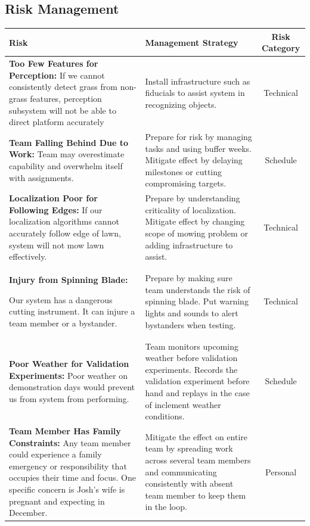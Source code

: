 \documentclass[12pt]{extarticle}
\begin{document}
\subsection{Risk Management}
\begin{table}[H]
\def\arraystretch{1.7}

\begin{tabular}{p{7cm}p{6cm}c}
 {Risk} &  {Management Strategy} &  {Risk Category}\\
\hline 
 \textbf{Too Few Features for Perception:} 
If we cannot consistently detect grass from non-grass features, perception subsystem will not be able to direct platform accurately
&
Install infrastructure such as fiducials to assist system in recognizing objects.
&
Technical\\

 \textbf{Team Falling Behind Due to Work:} 
Team may overestimate capability and overwhelm itself with assignments.
&
Prepare for risk by managing tasks and using buffer weeks. Mitigate effect by delaying milestones or cutting compromising targets.
&
Schedule\\
 \textbf{Localization Poor for Following Edges:} 
If our localization algorithms cannot accurately follow edge of lawn, system will not mow lawn effectively.
&
Prepare by understanding criticality of localization. Mitigate effect by changing scope of mowing problem or adding infrastructure to assist.
&
Technical\\
 \textbf{Injury from Spinning Blade:} 

Our system has a dangerous cutting instrument. It can injure a team member or a bystander.
&
Prepare by making sure team understands the risk of spinning blade. Put warning lights and sounds to alert bystanders when testing.
&
Technical\\

 \textbf{Poor Weather for Validation Experiments:} 
Poor weather on demonstration days would prevent us from system from performing.
&
Team monitors upcoming weather before validation experiments.  Records the validation experiment before hand and replays in the case of inclement weather conditions.
&
Schedule\\

 \textbf{Team Member Has Family Constraints:} 
Any team member could experience a family emergency or responsibility that occupies their time and focus. One specific concern is Josh's wife is pregnant and expecting in December.
&
Mitigate the effect on entire team by spreading work across several team members and communicating consistently with absent team member to keep them in the loop.
&
Personal\\


\end{tabular}
\end{table}
\end{document}
